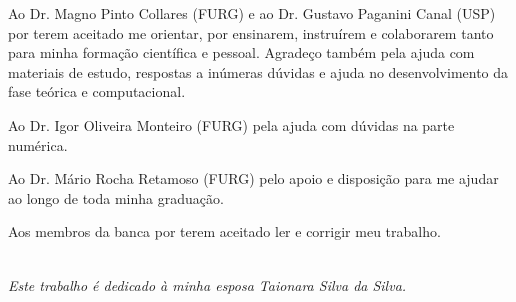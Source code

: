 \documentclass[12pt,oneside,a4paper]{abntex2}
\begin{document}

\imprimircapa
\imprimirfolhaderosto
\cleardoublepage


\begin{agradecimentos}
\noindent Ao Dr. Magno Pinto Collares (FURG) e ao Dr. Gustavo Paganini Canal (USP) por terem aceitado me orientar, por ensinarem, instruírem e colaborarem tanto para minha formação científica e pessoal. Agradeço também pela ajuda com materiais de estudo, respostas a inúmeras dúvidas e ajuda no desenvolvimento da fase teórica e computacional. 

\noindent Ao Dr. Igor Oliveira Monteiro (FURG) pela ajuda com dúvidas na parte numérica.  

\noindent Ao Dr. Mário Rocha Retamoso (FURG) pelo apoio e disposição para me ajudar ao longo de toda minha graduação.

\noindent Aos membros da banca por terem aceitado ler e corrigir meu trabalho.

   \vspace*{\fill}
   \centering
   \noindent
   \textit{\\ Este trabalho é dedicado à minha esposa Taionara Silva da Silva.}
   
   \vspace{.3cm}
\end{agradecimentos}


\tableofcontents
\newpage
\listoffigures
\newpage
\listoftables
\newpage
\lstlistoflistings

\newpage
\mainmatter
\end{document}
